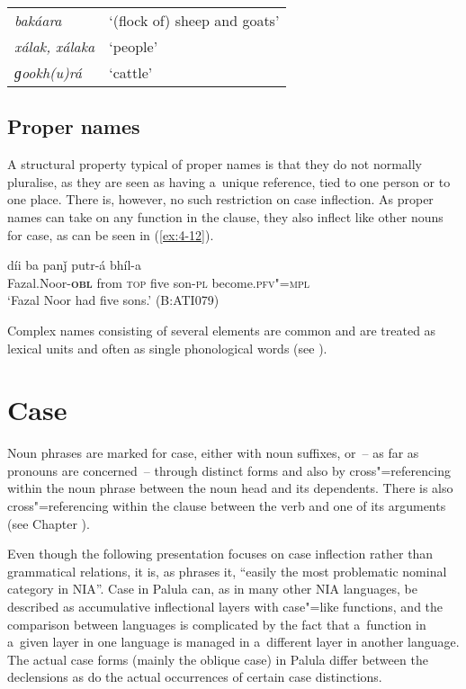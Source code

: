 \begin{exe}
\extab
\label{ex:4-coll}
\begin{tabularx}{\textwidth}{ l@{\hspace{40pt}} Q }
\textit{bakáara} &
`(flock of) sheep and goats'\\
\textit{xálak, xálaka} &
`people'\\
\textit{ɡookh(u)rá} &
`cattle'\\
\end{tabularx}
\end{exe}

\subsection{Proper names}
\label{subsec:4-4-3}

A structural property typical of proper names is that they do not normally pluralise, as they are seen as having a~unique reference, tied to one person or to one place. There is, however, no such restriction on case inflection. As proper names can take on any function in the clause, they also inflect like other nouns for case, as can be seen in (\ref{ex:4-12}).

\begin{exe}
\ex
\label{ex:4-12}
\gll [fazelnuur-á] díi ba panǰ putr-á bhíl-a \\
	Fazal.Noor-\textbf{\textsc{obl}} from \textsc{top} five son-\textsc{pl} become.\textsc{pfv"=mpl} \\
\glt `Fazal Noor had five sons.' (B:ATI079)
\end{exe}

Complex names consisting of several elements are common and are treated as lexical units and often as single phonological words (see ).

\section{Case}
\label{sec:4-5}

Noun phrases are marked for case, either with noun suffixes, or~-- as far as pronouns are concerned~-- through distinct forms and also by cross"=referencing within the noun phrase between the noun head and its dependents. There is also cross"=referencing within the clause between the verb and one of its arguments (see Chapter ).


Even though the following presentation focuses on case inflection rather than grammatical relations, it is, as \citet[230--231]{masica1991} phrases it, ``easily the most problematic nominal category in NIA''. Case in Palula can, as in many other NIA languages, be described as accumulative inflectional layers with case"=like functions, and the comparison between languages is complicated by the fact that a~function in a~given layer in one language is managed in a~different layer in another language. The actual case forms (mainly the oblique case) in Palula differ between the declensions as do the actual occurrences of certain case distinctions. 


